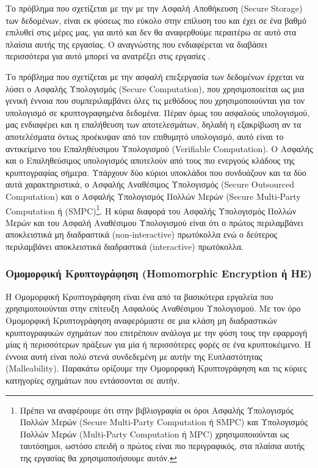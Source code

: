 Το πρόβλημα που σχετίζεται με την με την Ασφαλή Αποθήκευση (Secure Storage) των δεδομένων, είναι εκ φύσεως πιο εύκολο στην επίλυση του και έχει σε ένα βαθμό επιλυθεί στις μέρες μας, για αυτό και δεν θα αναφερθούμε περαιτέρω σε αυτό στα πλαίσια αυτής της εργασίας. Ο αναγνώστης που ενδιαφέρεται να διαβάσει περισσότερα για αυτό μπορεί να ανατρέξει στις εργασίες \cite{10.1145/1315245.1315318} \cite{DBLP:journals/access/Gupta0LB22}. 

Το πρόβλημα που σχετίζεται με την ασφαλή επεξεργασία των δεδομένων έρχεται να λύσει ο Ασφαλής Υπολογισμός (Secure Computation), που χρησιμοποιείται ως μια γενική έννοια που συμπεριλαμβάνει όλες τις μεθόδους που χρησιμοποιούνται για τον υπολογισμό σε κρυπτογραφημένα δεδομένα. Πέραν όμως του ασφαλούς υπολογισμού, μας ενδιαφέρει και η επαλήθευση των αποτελεσμάτων, δηλαδή η εξακρίβωση αν τα αποτελέσματα όντως προέκυψαν από τον επιθυμητό υπολογισμό, αυτό είναι το αντικείμενο του Επαληθέυσιμου Υπολογισμού (Verifiable Computation). Ο Ασφαλής και ο Επαληθεύσιμος υπολογισμός αποτελούν από τους πιο ενεργούς κλάδους της κρυπτογραφίας σήμερα. Υπάρχουν δύο κύριοι υποκλάδοι που συνδυάζουν και τα δύο αυτά χαρακτηριστικά, ο Ασφαλής Αναθέσιμος Υπολογισμός (Secure Outsourced Computation) και ο Ασφαλής Υπολογισμός Πολλών Μερών (Secure Multi-Party Computation ή (SMPC)\footnote{Πρέπει να αναφέρουμε ότι στην βιβλιογραφία οι όροι Ασφαλής Υπολογισμός Πολλών Μερών (Secure Multi-Party Computation ή  SMPC) και Υπολογισμός Πολλών Μερών (Multi-Party Computation ή MPC)  χρησιμοποιούνται ως ταυτόσημοι, ωστόσο επειδή ο πρώτος είναι πιο περιγραφικός, στα πλαίσια αυτής της εργασίας θα χρησιμοποιήσουμε αυτόν.}. Η κύρια διαφορά του Ασφαλής Υπολογισμός Πολλών Μερών και του Ασφαλή Αναθέσιμου Υπολογισμού είναι ότι ο πρώτος περιλαμβάνει αποκλειστικά μη διαδραστικά (non-interactive) πρωτόκολλα ενώ ο δεύτερος περιλαμβάνει αποκλειστικά διαδραστικά (interactive) πρωτόκολλα.

\subsubsection{Ομομορφική Κρυπτογράφηση (Homomorphic Encryption ή HE)}
Η Ομομορφική Κρυπτογράφηση είναι ένα από τα βασικότερα εργαλεία που χρησιμοποιούνται στην επίτευξη Ασφαλούς Αναθέσιμου Υπολογισμού. Με τον όρο Ομομορφική Κρυπτογράφηση αναφερόμαστε σε μια κλάση μη διαδραστικών κρυπτογραφικών σχημάτων που επιτρέπουν ανάλογα με την φύση τους την εφαρμογή μίας ή περισσότερων πράξεων για μία ή περισσότερες φορές σε ένα κρυπτοκέιμενο. Η έννοια αυτή είναι πολύ στενά συνδεδεμένη με αυτήν της Ευπλαστότητας (Malleability). Παρακάτω ορίζουμε την Ομομορφική Κρυπτογράφηση και τις κύριες κατηγορίες σχημάτων που εντάσσονται σε αυτήν.

